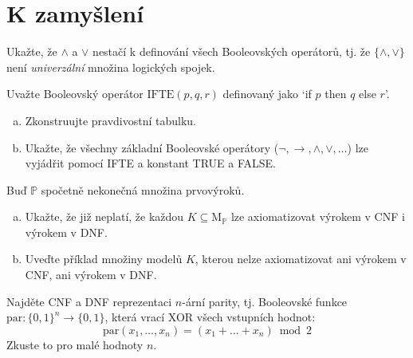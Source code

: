 \section*{K zamyšlení}


\begin{problem}
    
    Ukažte, že $\wedge$ a $\vee$ nestačí k definování všech Booleovských operátorů, tj. že $\{\wedge,\vee\}$ není \emph{univerzální} množina logických spojek.

\end{problem}


\begin{problem}
    
    Uvažte Booleovský operátor $\mathrm{IFTE}(p, q, r)$ definovaný jako `if $p$ then $q$ else $r$'. 
    \begin{enumerate}[(a)]
        \item Zkonstruujte pravdivostní tabulku.
        \item Ukažte, že všechny základní Booleovské operátory ($\neg, \to, \wedge,\vee,\dots$) lze vyjádřit pomocí IFTE a konstant TRUE a FALSE.
    \end{enumerate}

\end{problem}


\begin{problem} 
    
    Buď $\mathbb P$ spočetně nekonečná množina prvovýroků.    
    \begin{enumerate}[(a)]
        \item Ukažte, že již neplatí, že každou $K\subseteq \mathrm{M}_\mathbb P$ lze axiomatizovat výrokem v CNF i výrokem v DNF.
        \item  Uveďte příklad množiny modelů $K$, kterou nelze axiomatizovat ani výrokem v CNF, ani výrokem v DNF.
    \end{enumerate}

\end{problem}


\begin{problem} 
    
    Najděte CNF a DNF reprezentaci $n$-ární parity, tj. Booleovské funkce $\mathrm{par}\colon\{0,1\}^n\to \{0,1\}$,
    která vrací XOR všech vstupních hodnot:
    $$
    \mathrm{par}(x_1,\dots,x_n)=(x_1+\dots+x_n)\bmod 2
    $$
    Zkuste to pro malé hodnoty $n$.

\end{problem}


